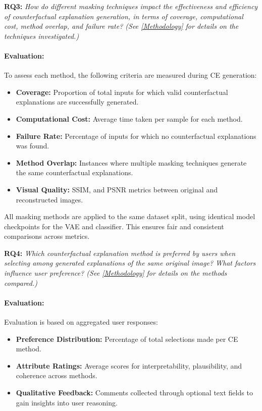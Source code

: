 \vspace{1em}
    
\textbf{RQ3:} \textit{How do different masking techniques impact the effectiveness and efficiency of counterfactual explanation generation, in terms of coverage, computational cost, method overlap, and failure rate? (See \cref{Methodology} for details on the techniques investigated.)}

\vspace{-1em}

\paragraph{Evaluation:} To assess each method, the following criteria are measured during CE generation:
    \begin{itemize}
        \item \textbf{Coverage:} Proportion of total inputs for which valid counterfactual explanations are successfully generated.
        \item \textbf{Computational Cost:} Average time taken per sample for each method.
        \item \textbf{Failure Rate:} Percentage of inputs for which no counterfactual explanations was found.
        \item \textbf{Method Overlap:} Instances where multiple masking techniques generate the same counterfactual explanations.
        \item \textbf{Visual Quality:} SSIM, and PSNR metrics between original and reconstructed images.
    \end{itemize}

    All masking methods are applied to the same dataset split, using identical model checkpoints for the VAE and classifier. This ensures fair and consistent comparisons across metrics.

\vspace{1em}

\textbf{RQ4:} \textit{ Which counterfactual explanation method is preferred by users when selecting among generated explanations of the same original image? What factors influence user preference? (See \cref{Methodology} for details on the methods compared.)}

\vspace{-1em}

\paragraph{Evaluation:} Evaluation is based on aggregated user responses:
    \begin{itemize}
        \item \textbf{Preference Distribution:} Percentage of total selections made per CE method.
        \item \textbf{Attribute Ratings:} Average scores for interpretability, plausibility, and coherence across methods.
        \item \textbf{Qualitative Feedback:} Comments collected through optional text fields to gain insights into user reasoning.
    \end{itemize}

